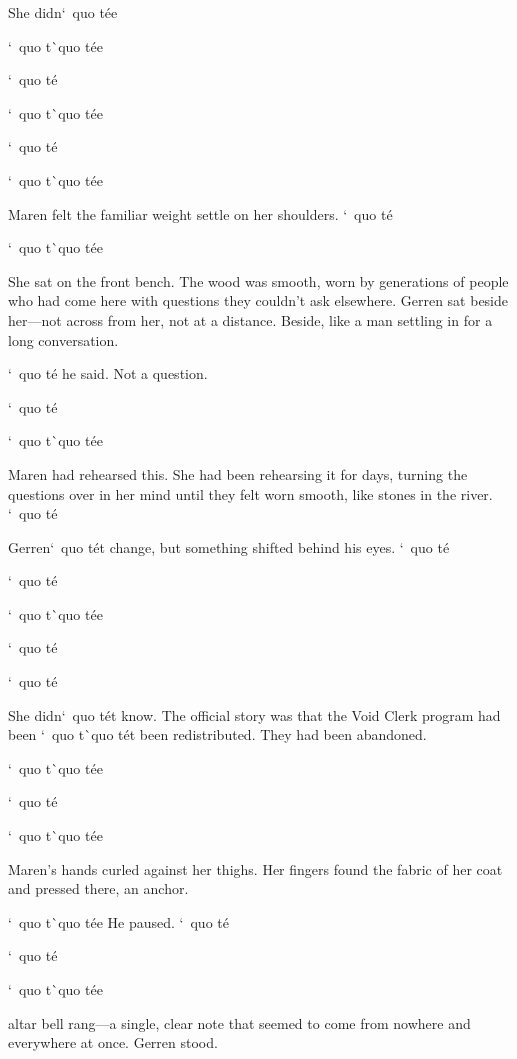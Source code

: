 \documentclass[12pt,letterpaper,openany]{book}
\begin{document}
She didn`\ quo t\'e{}e{}
\par
`\ quo t\`\ quo t\'e{}e{}
\par
`\ quo t\'e{}
\par
`\ quo t\`\ quo t\'e{}e{}
\par
`\ quo t\'e{}
\par
`\ quo t\`\ quo t\'e{}e{}
\par
Maren felt the familiar weight settle on her shoulders. `\ quo t\'e{}
\par
`\ quo t\`\ quo t\'e{}e{}
\par
She sat on the front bench. The wood was smooth, worn by generations of people who had come here with questions they couldn't ask elsewhere. Gerren sat beside her—not across from her, not at a distance. Beside, like a man settling in for a long conversation.
\par
`\ quo t\'e{} he said. Not a question.
\par
`\ quo t\'e{}
\par
`\ quo t\`\ quo t\'e{}e{}
\par
Maren had rehearsed this. She had been rehearsing it for days, turning the questions over in her mind until they felt worn smooth, like stones in the river. `\ quo t\'e{}
\par
Gerren`\ quo t\'e{}t change, but something shifted behind his eyes. `\ quo t\'e{}
\par
`\ quo t\'e{}
\par
`\ quo t\`\ quo t\'e{}e{}
\par
`\ quo t\'e{}
\par
`\ quo t\'e{}
\par
She didn`\ quo t\'e{}t know. The official story was that the Void Clerk program had been `\ quo t\`\ quo t\'e{}t been redistributed. They had been abandoned.
\par
`\ quo t\`\ quo t\'e{}e{}
\par
`\ quo t\'e{}
\par
`\ quo t\`\ quo t\'e{}e{}
\par
Maren's hands curled against her thighs. Her fingers found the fabric of her coat and pressed there, an anchor.
\par
`\ quo t\`\ quo t\'e{}e{} He paused. `\ quo t\'e{}
\par
`\ quo t\'e{}
\par
`\ quo t\`\ quo t\'e{}e{}
\par
\hrulefillThe altar bell rang—a single, clear note that seemed to come from nowhere and everywhere at once. Gerren stood.
\end{document}
